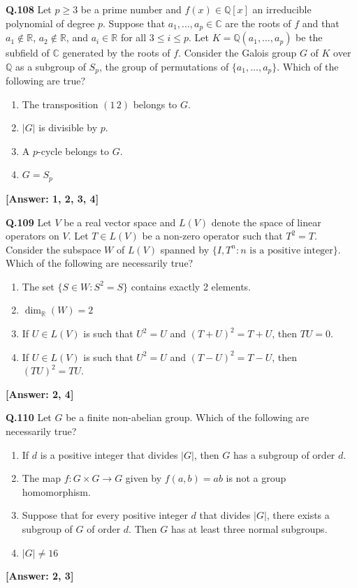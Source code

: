 \documentclass[12pt,a4paper]{article}
\newcommand{\ans}[1]{\quad\textcolor{anscolor}{\textbf{[Answer: #1]}}}
\begin{document}
\textbf{Q.108} Let $p\ge3$ be a prime number and $f(x)\in\mathbb{Q}[x]$ an irreducible polynomial of degree $p$. Suppose that $a_1,\ldots,a_p\in\mathbb{C}$ are the roots of $f$ and that $a_1\notin\mathbb{R}$, $a_2\notin\mathbb{R}$, and $a_i\in\mathbb{R}$ for all $3\le i\le p$. Let $K=\mathbb{Q}(a_1,\ldots,a_p)$ be the subfield of $\mathbb{C}$ generated by the roots of $f$. Consider the Galois group $G$ of $K$ over $\mathbb{Q}$ as a subgroup of $S_p$, the group of permutations of $\{a_1,\ldots,a_p\}$. Which of the following are true?
\begin{enumerate}[label=\arabic*.]
\item The transposition $(1\,2)$ belongs to $G$. \item $|G|$ is divisible by $p$.
\item A $p$-cycle belongs to $G$. \item $G=S_p$
\end{enumerate}\ans{1, 2, 3, 4}

\textbf{Q.109} Let $V$ be a real vector space and $L(V)$ denote the space of linear operators on $V$. Let $T\in L(V)$ be a non-zero operator such that $T^2=T$. Consider the subspace $W$ of $L(V)$ spanned by $\{I,T^n:n\text{ is a positive integer}\}$. Which of the following are necessarily true?
\begin{enumerate}[label=\arabic*.]
\item The set $\{S\in W:S^2=S\}$ contains exactly 2 elements.
\item $\dim_\mathbb{R}(W)=2$
\item If $U\in L(V)$ is such that $U^2=U$ and $(T+U)^2=T+U$, then $TU=0$.
\item If $U\in L(V)$ is such that $U^2=U$ and $(T-U)^2=T-U$, then $(TU)^2=TU$.
\end{enumerate}\ans{2, 4}

\textbf{Q.110} Let $G$ be a finite non-abelian group. Which of the following are necessarily true?
\begin{enumerate}[label=\arabic*.]
\item If $d$ is a positive integer that divides $|G|$, then $G$ has a subgroup of order $d$.
\item The map $f:G\times G\to G$ given by $f(a,b)=ab$ is not a group homomorphism.
\item Suppose that for every positive integer $d$ that divides $|G|$, there exists a subgroup of $G$ of order $d$. Then $G$ has at least three normal subgroups.
\item $|G|\neq16$
\end{enumerate}\ans{2, 3}
\end{document}
